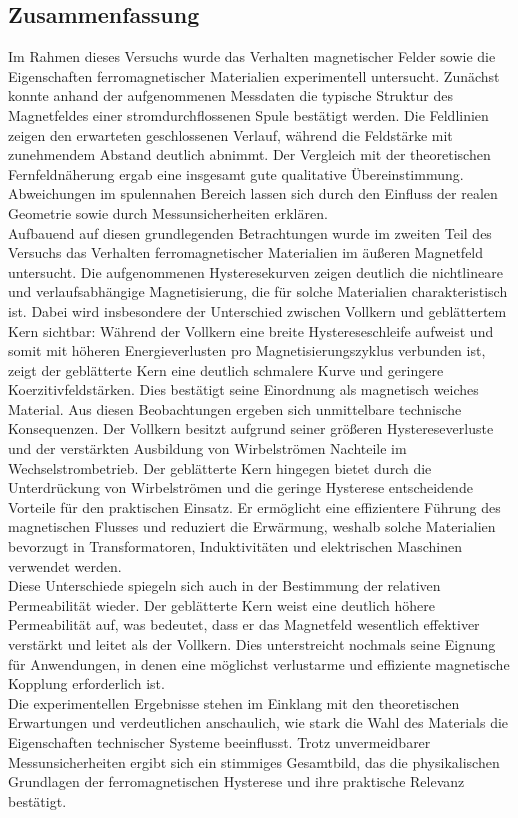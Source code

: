 \subsection{Zusammenfassung}
Im Rahmen dieses Versuchs wurde das Verhalten magnetischer Felder sowie die Eigenschaften ferromagnetischer Materialien experimentell untersucht. Zunächst konnte anhand der aufgenommenen Messdaten die typische Struktur des Magnetfeldes einer stromdurchflossenen Spule bestätigt werden. Die Feldlinien zeigen den erwarteten geschlossenen Verlauf, während die Feldstärke mit zunehmendem Abstand deutlich abnimmt. Der Vergleich mit der theoretischen Fernfeldnäherung ergab eine insgesamt gute qualitative Übereinstimmung. Abweichungen im spulennahen Bereich lassen sich durch den Einfluss der realen Geometrie sowie durch Messunsicherheiten erklären. \\
Aufbauend auf diesen grundlegenden Betrachtungen wurde im zweiten Teil des Versuchs das Verhalten ferromagnetischer Materialien im äußeren Magnetfeld untersucht. Die aufgenommenen Hysteresekurven zeigen deutlich die nichtlineare und verlaufsabhängige Magnetisierung, die für solche Materialien charakteristisch ist. Dabei wird insbesondere der Unterschied zwischen Vollkern und geblättertem Kern sichtbar: Während der Vollkern eine breite Hystereseschleife aufweist und somit mit höheren Energieverlusten pro Magnetisierungszyklus verbunden ist, zeigt der geblätterte Kern eine deutlich schmalere Kurve und geringere Koerzitivfeldstärken. Dies bestätigt seine Einordnung als magnetisch weiches Material.
Aus diesen Beobachtungen ergeben sich unmittelbare technische Konsequenzen. Der Vollkern besitzt aufgrund seiner größeren Hystereseverluste und der verstärkten Ausbildung von Wirbelströmen Nachteile im Wechselstrombetrieb. Der geblätterte Kern hingegen bietet durch die Unterdrückung von Wirbelströmen und die geringe Hysterese entscheidende Vorteile für den praktischen Einsatz. Er ermöglicht eine effizientere Führung des magnetischen Flusses und reduziert die Erwärmung, weshalb solche Materialien bevorzugt in Transformatoren, Induktivitäten und elektrischen Maschinen verwendet werden. \\
Diese Unterschiede spiegeln sich auch in der Bestimmung der relativen Permeabilität wieder. Der geblätterte Kern weist eine deutlich höhere Permeabilität auf, was bedeutet, dass er das Magnetfeld wesentlich effektiver verstärkt und leitet als der Vollkern. Dies unterstreicht nochmals seine Eignung für Anwendungen, in denen eine möglichst verlustarme und effiziente magnetische Kopplung erforderlich ist. \\
Die experimentellen Ergebnisse stehen im Einklang mit den theoretischen Erwartungen und verdeutlichen anschaulich, wie stark die Wahl des Materials die Eigenschaften technischer Systeme beeinflusst. Trotz unvermeidbarer Messunsicherheiten ergibt sich ein stimmiges Gesamtbild, das die physikalischen Grundlagen der ferromagnetischen Hysterese und ihre praktische Relevanz bestätigt.